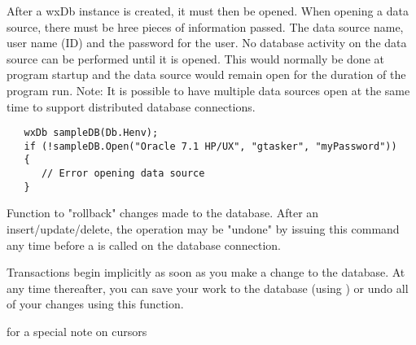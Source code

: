 
After a wxDb instance is created, it must then be opened.  When opening a data source, there must be hree pieces of information passed.  The data source name, user name (ID) and the password for the user.  No database activity on the data source can be performed until it is opened.  This would normally be done at program startup and the data source would remain open for the duration of the program run.  Note: It is possible to have multiple data sources open at the same time to support distributed database connections. 

\begin{verbatim}
   wxDb sampleDB(Db.Henv);
   if (!sampleDB.Open("Oracle 7.1 HP/UX", "gtasker", "myPassword"))
   {
      // Error opening data source
   }
\end{verbatim}


\label{wxdbrollbacktrans}


Function to "rollback" changes made to the database.  After an insert/update/delete, the operation may be "undone" by issuing this command any time before a  is called on the database connection.


Transactions begin implicitly as soon as you make a change to the database.  At any time thereafter, you can save your work to the database (using ) or undo all of your changes using this function.



 for a special note on cursors

\label{wxdbsetsqllogging}




